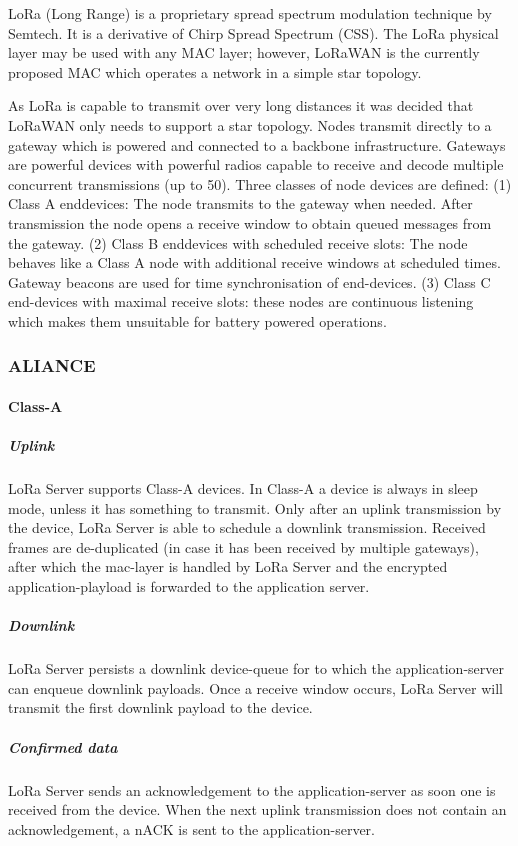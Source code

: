 LoRa (Long Range) is a proprietary spread spectrum modulation technique by Semtech.
It is a derivative of Chirp Spread Spectrum (CSS).
The LoRa physical layer may be used with any MAC layer;
	however,
	LoRaWAN is the currently proposed MAC which operates a network in a simple star topology.

As LoRa is capable to transmit over very long distances it was decided that LoRaWAN only needs to support a star topology.
Nodes transmit directly to a gateway which is powered and connected to a backbone infrastructure.
Gateways are powerful devices with powerful radios capable to receive and decode multiple concurrent transmissions (up to 50).
Three classes of node devices are defined:
	(1) Class A enddevices:
	The node transmits to the gateway when needed.
After transmission the node opens a receive window to obtain queued messages from the gateway.
(2) Class B enddevices with scheduled receive slots:
	The node behaves like a Class A node with additional receive windows at scheduled times.
Gateway beacons are used for time synchronisation of end-devices.
(3) Class C end-devices with maximal receive slots:
	these nodes are continuous listening which makes them unsuitable for battery powered operations.


\subsubsection{ALIANCE}


\paragraph{Class-A}

\subparagraph{Uplink}
LoRa Server supports Class-A devices.
In Class-A a device is always in sleep mode,
	unless it has something to transmit.
Only after an uplink transmission by the device,
	LoRa Server is able to schedule a downlink transmission.
Received frames are de-duplicated (in case it has been received by multiple gateways),
	after which the mac-layer is handled by LoRa Server and the encrypted application-playload is forwarded to the application server.

\subparagraph{Downlink}
LoRa Server persists a downlink device-queue for to which the application-server can enqueue downlink payloads.
Once a receive window occurs,
	LoRa Server will transmit the first downlink payload to the device.

\subparagraph{Confirmed data}
LoRa Server sends an acknowledgement to the application-server as soon one is received from the device.
When the next uplink transmission does not contain an acknowledgement,
	a nACK is sent to the application-server.

